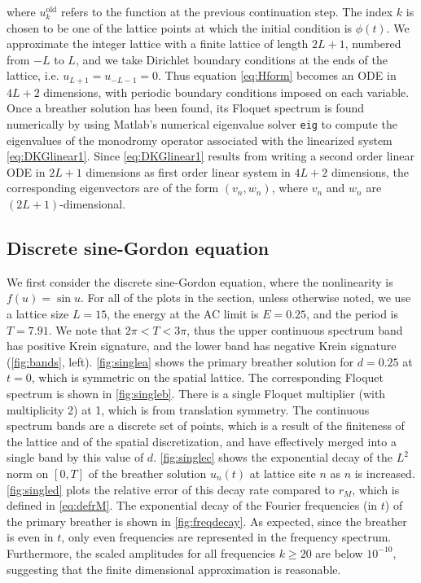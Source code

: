 \documentclass[12pt,reqno]{amsart}
\theoremstyle{definition}
\begin{document}
where $u_k^\text{old}$ refers to the function at the previous continuation step. The index $k$ is chosen to be one of the lattice points at which the initial condition is $\phi(t)$. We approximate the integer lattice with a finite lattice of length $2L+1$, numbered from $-L$ to $L$, and we take Dirichlet boundary conditions at the ends of the lattice, i.e. $u_{L+1} = u_{-L-1} = 0$. Thus equation \cref{eq:Hform} becomes an ODE in $4L+2$ dimensions, with periodic boundary conditions imposed on each variable. Once a breather solution has been found, its Floquet spectrum is found numerically by using Matlab's numerical eigenvalue solver \texttt{eig} to compute the eigenvalues of the monodromy operator associated with the linearized system \cref{eq:DKGlinear1}. Since \cref{eq:DKGlinear1} results from writing a second order linear ODE in $2L+1$ dimensions as first order linear system in $4L+2$ dimensions, the corresponding eigenvectors are of the form $(v_n, w_n)$, where $v_n$ and $w_n$ are $(2L+1)$-dimensional.

\subsection{Discrete sine-Gordon equation}

We first consider the discrete sine-Gordon equation, where the nonlinearity is $f(u) = \sin u$. For all of the plots in the section, unless otherwise noted, we use a lattice size $L = 15$, the energy at the AC limit is $E = 0.25$, and the period is $T = 7.91$. We note that $2 \pi < T < 3 \pi$, thus the upper continuous spectrum band has positive Krein signature, and the lower band has negative Krein signature (\cref{fig:bands}, left).
\cref{fig:singlea} shows the primary breather solution for $d = 0.25$ at $t = 0$, which is symmetric on the spatial lattice. The corresponding Floquet spectrum is shown in \cref{fig:singleb}. There is a single Floquet multiplier (with multiplicity 2) at 1, which is from translation symmetry. The continuous spectrum bands are a discrete set of points, which is a result of the finiteness
of the lattice and of the spatial discretization, and have effectively merged into a single band by this value of $d$. 
\cref{fig:singlec} shows the exponential decay of the $L^2$ norm on $[0,T]$ of the breather solution $u_n(t)$ at lattice site $n$ as $n$ is increased. \cref{fig:singled} plots the relative error of this decay rate compared to $r_M$, which is defined in \cref{eq:defrM}. The exponential decay of the Fourier frequencies (in $t$) of the primary breather is shown in \cref{fig:freqdecay}. As expected, since the breather is even in $t$, only even frequencies are represented in the frequency spectrum. Furthermore, the scaled amplitudes for all frequencies $k\geq 20$ are below $10^{-10}$, suggesting that the finite dimensional approximation is reasonable.
\end{document}
